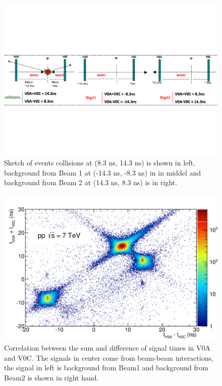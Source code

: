 \begin{figure}[htbp]
\begin{center}
\includegraphics[width=14.cm]{./Version1/FigChapter4/V0time}
\caption{Sketch of events collisions at (8.3 ns, 14.3 ns) is shown in left, background from Beam 1 at (-14.3 ns, -8.3 ns) in in middel and background from Beam 2 at (14.3 ns, 8.3 ns) is in right.}
\label{fig:v0time}
\end{center}
\end{figure}

\begin{figure}[htbp]
\begin{center}
\includegraphics[width=10.cm]{./Version1/FigChapter4/FigureV0}
\caption{Correlation between the sum and difference of signal times in V0A and V0C. The signals in center come from beam-beam interactions, the signal in left is background from Beam1 and background from Beam2 is shown in right hand.}
\label{fig:v0}
\end{center}
\end{figure}



